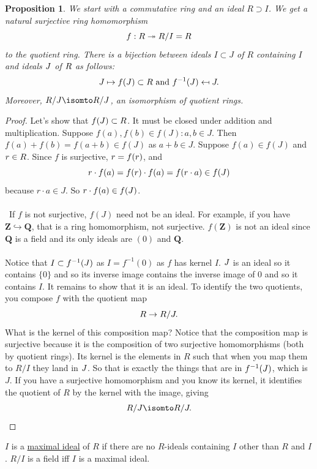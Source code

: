 \documentclass[11pt, oneside]{amsart}
\numberwithin{equation}{section}
\numberwithin{theorem}{section}
\newtheorem{proposition}[theorem]{Proposition}
\theoremstyle{definition}
\let\bar\relax
\def\Z{\mathbf{Z}}
\def\Q{\mathbf{Q}}
\begin{document}
{\begin{proposition}
We start with a commutative ring and an ideal $R\supset I$. We get a natural surjective ring homomorphism
$$
f: R  \twoheadrightarrow R/I =\bar R 
$$
to the quotient ring. There is a bijection between ideals $I\subset J$ of $R$ containing $I$ and ideals $\bar J$ of $\bar R$ as follows:
$$
J\mapsto f(J) \subset \bar R \textrm{ and } f^{-1}(\bar J) \mapsfrom \bar J.
$$
Moreover, $R/J\isomto \bar R/\bar J$, an isomorphism of quotient rings.
\end{proposition}
\begin{proof}
Let's show that $f(J)\subset \bar R$. It must be closed under addition and multiplication. Suppose $f(a),f(b)\in f(J):a,b\in J$. Then $f(a) + f(b) = f(a+b)\in f(J)$ as $a+b\in J$. Suppose $f(a)\in f(J)$ and $\bar r \in \bar R$. Since $f$ is surjective, $\bar r = f(r)$, and 
$$
\bar r\cdot f(a) = f(r)\cdot f(a) = f(r\cdot a) \in f(J)
$$
because $r\cdot a\in J$. So $\bar r\cdot f(a) \in f(J)$.  \\\\
\noindent\hspace*{-23pt} \dbend\ If $f$ is not surjective, $f(J)$ need not be an ideal. For example, if you have $\Z\hookrightarrow \Q$, that is a ring homomorphism, not surjective. $f(\Z)$ is not an ideal since $\Q$ is a field and its only ideals are $(0)$ and $\Q$.\\\\
Notice that $I\subset f^{-1}(\bar J)$ as $I = f^{-1}(0)$ as $f$ has kernel $I$. $\bar J$ is an ideal so it contains $\{0\}$ and so its inverse image contains the inverse image of $0$ and so it contains $I$. It remains to show that it is an ideal. To identify the two quotients, you compose $f$ with the quotient map 
$$
\bar R \to \bar R/\bar J.
$$
What is the kernel of this composition map? Notice that the composition map is surjective because it is the composition of two surjective homomorphisms (both by quotient rings). Its kernel is the elements in $R$ such that when you map them to $R/I$ they land in $\bar J$. So that is exactly the things that are in $f^{-1}(\bar J)$, which is $J$. If you have a surjective homomorphism and you know its kernel, it identifies the quotient of $R$ by the kernel with the image, giving 
$$
R/J\isomto \bar R/\bar J.
$$
\end{proof}

$I$ is a \underline{maximal ideal} of $R$ if there are no $R$-ideals containing $I$ other than $R$ and $I$. $R/I$ is a field iff $I$ is a maximal ideal.

}
\end{document}
